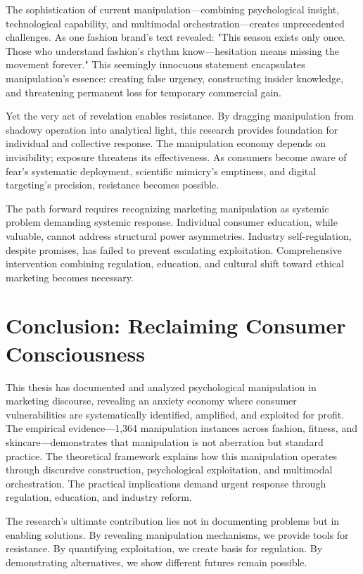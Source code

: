 The sophistication of current manipulation—combining psychological insight, technological capability, and multimodal orchestration—creates unprecedented challenges. As one fashion brand's text revealed: "This season exists only once. Those who understand fashion's rhythm know—hesitation means missing the movement forever." This seemingly innocuous statement encapsulates manipulation's essence: creating false urgency, constructing insider knowledge, and threatening permanent loss for temporary commercial gain.

Yet the very act of revelation enables resistance. By dragging manipulation from shadowy operation into analytical light, this research provides foundation for individual and collective response. The manipulation economy depends on invisibility; exposure threatens its effectiveness. As consumers become aware of fear's systematic deployment, scientific mimicry's emptiness, and digital targeting's precision, resistance becomes possible.

The path forward requires recognizing marketing manipulation as systemic problem demanding systemic response. Individual consumer education, while valuable, cannot address structural power asymmetries. Industry self-regulation, despite promises, has failed to prevent escalating exploitation. Comprehensive intervention combining regulation, education, and cultural shift toward ethical marketing becomes necessary.

\section{Conclusion: Reclaiming Consumer Consciousness}
\label{sec:final_conclusion}

This thesis has documented and analyzed psychological manipulation in marketing discourse, revealing an anxiety economy where consumer vulnerabilities are systematically identified, amplified, and exploited for profit. The empirical evidence—1,364 manipulation instances across fashion, fitness, and skincare—demonstrates that manipulation is not aberration but standard practice. The theoretical framework explains how this manipulation operates through discursive construction, psychological exploitation, and multimodal orchestration. The practical implications demand urgent response through regulation, education, and industry reform.

The research's ultimate contribution lies not in documenting problems but in enabling solutions. By revealing manipulation mechanisms, we provide tools for resistance. By quantifying exploitation, we create basis for regulation. By demonstrating alternatives, we show different futures remain possible.

